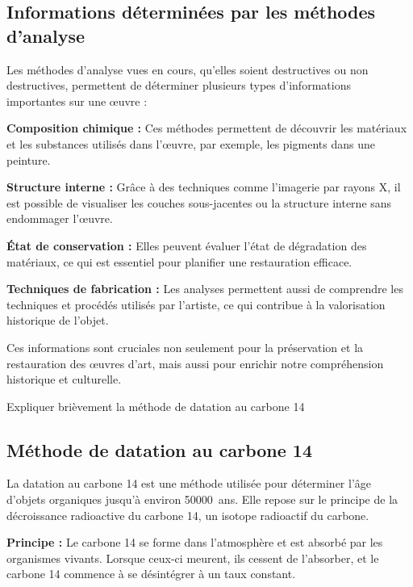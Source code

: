 \documentclass[answers]{exam}
\begin{document}
\begin{questions}
\begin{solution}
\subsection*{Informations déterminées par les méthodes d'analyse}

Les méthodes d'analyse vues en cours, qu'elles soient destructives ou non destructives, permettent de déterminer plusieurs types d'informations importantes sur une œuvre :

\begin{compactitem}
    \item \textbf{Composition chimique :} Ces méthodes permettent de découvrir les matériaux et les substances utilisés dans l'œuvre, par exemple, les pigments dans une peinture.
    \item \textbf{Structure interne :} Grâce à des techniques comme l'imagerie par rayons X, il est possible de visualiser les couches sous-jacentes ou la structure interne sans endommager l'œuvre.
    \item \textbf{État de conservation :} Elles peuvent évaluer l'état de dégradation des matériaux, ce qui est essentiel pour planifier une restauration efficace.
    \item \textbf{Techniques de fabrication :} Les analyses permettent aussi de comprendre les techniques et procédés utilisés par l'artiste, ce qui contribue à la valorisation historique de l'objet.
\end{compactitem}

Ces informations sont cruciales non seulement pour la préservation et la restauration des œuvres d'art, mais aussi pour enrichir notre compréhension historique et culturelle.

\end{solution}

\question[1] Expliquer brièvement la méthode de datation au carbone 14 


\begin{solution}

\subsection*{Méthode de datation au carbone 14}

La datation au carbone 14 est une méthode utilisée pour déterminer l'âge d'objets organiques jusqu'à environ \SI{50000}{ans}. Elle repose sur le principe de la décroissance radioactive du carbone 14, un isotope radioactif du carbone.

\begin{compactitem}
    \item \textbf{Principe :} Le carbone 14 se forme dans l'atmosphère et est absorbé par les organismes vivants. Lorsque ceux-ci meurent, ils cessent de l'absorber, et le carbone 14 commence à se désintégrer à un taux constant.
    

\end{compactitem}
\end{solution}
\end{questions}
\end{document}
